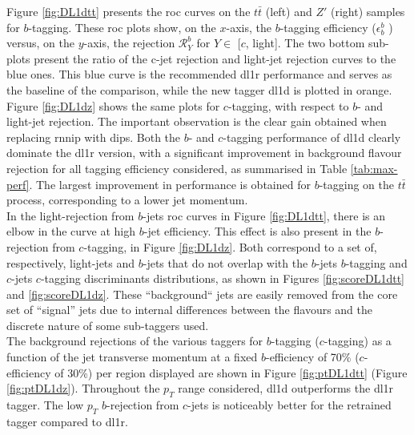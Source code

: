 Figure \ref{fig:DL1dtt} presents the \gls{roc} curves on the $t\bar{t}$ (left) and $Z'$ (right) samples for  $b$-tagging. These \gls{roc} plots show, on the $x$-axis, the $b$-tagging efficiency ($\epsilon^b_b$ ) versus, on the $y$-axis, the rejection $\mathcal{R}^b_Y$ for $Y \in$ [$c$, light]. The two bottom sub-plots present the ratio of the c-jet rejection and light-jet rejection curves to the blue ones. This blue curve is the recommended \gls{dl1r} performance and serves as the baseline of the comparison, while the new tagger \gls{dl1d} is plotted in orange. Figure \ref{fig:DL1dz} shows the same plots for $c$-tagging, with respect to $b$- and light-jet rejection.  The important observation is the clear gain obtained when replacing \gls{rnnip} with \gls{dips}. Both the $b$- and $c$-tagging performance of \gls{dl1d} clearly dominate the \gls{dl1r} version, with a significant improvement in background flavour rejection for all tagging efficiency considered, as summarised in Table \ref{tab:max-perf}. The largest improvement in performance is obtained for $b$-tagging on the $t\bar{t}$ process, corresponding to a lower jet momentum. \\

In the light-rejection from $b$-jets \gls{roc} curves in Figure \ref{fig:DL1dtt}, there is an elbow in the curve at high $b$-jet efficiency. This effect is also present in the $b$-rejection from $c$-tagging, in Figure \ref{fig:DL1dz}. Both correspond to a set of, respectively, light-jets and $b$-jets that do not overlap with the $b$-jets $b$-tagging and $c$-jets $c$-tagging discriminants distributions, as shown in Figures \ref{fig:scoreDL1dtt} and \ref{fig:scoreDL1dz}. These ``background`` jets are easily removed from the core set of ``signal'' jets due to internal differences between the flavours and the discrete nature of some sub-taggers used.  \\

The background rejections of the various taggers for $b$-tagging ($c$-tagging) as a function of the jet transverse momentum at a fixed $b$-efficiency of 70\% ($c$-efficiency of 30\%) per region displayed are shown in Figure \ref{fig:ptDL1dtt} (Figure \ref{fig:ptDL1dz}). Throughout the $p_T$ range considered, \gls{dl1d} outperforms the \gls{dl1r} tagger. The low $p_T$ $b$-rejection from $c$-jets is noticeably better for the retrained tagger compared to \gls{dl1r}. 

